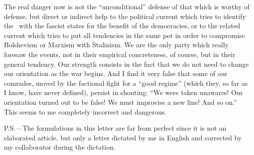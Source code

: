 The real danger now is not the “unconditional” defense of that which is worthy of defense, but direct or indirect help to the political current which tries to identify the \USSR\ with the fascist states for the benefit of the democracies, or to the related current which tries to put all tendencies in the same pot in order to compromise Bolshevism or Marxism with Stalinism. We are the only party which really foresaw the events, not in their empirical concreteness, of course, but in their general tendency. Our strength consists in the fact that we do not need to change our orientation as the war begins. And I find it very false that some of our comrades, moved by the factional fight for a “good regime” (which they, so far as I know, have never defined), persist in shouting: “We were taken unawares! Our orientation turned out to be false! We must improvise a new line! And so on.” This seems to me completely incorrect and dangerous.



\begin{postscriptum}
  P.S.---The formulations in this letter are far from perfect since it is not an elaborated article, but only a letter dictated by me in English and corrected by my collaborator during the dictation.
\end{postscriptum}

